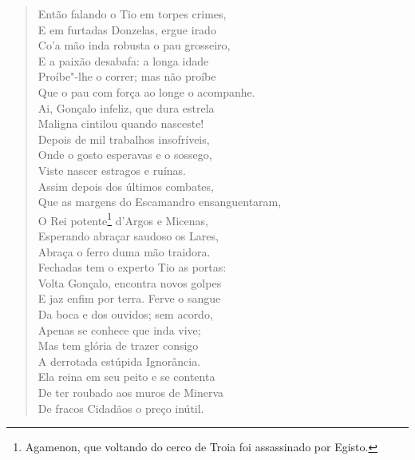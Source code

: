 \begin{verse}
Então falando o Tio em torpes crimes,\\
E em furtadas Donzelas, ergue irado\\
Co'a mão inda robusta o pau grosseiro,\\
E a paixão desabafa: a longa idade\\
Proíbe"-lhe o correr; mas não proíbe\\
Que o pau com força ao longe o acompanhe.\\
Ai, Gonçalo infeliz, que dura estrela\\
Maligna cintilou quando nasceste!\\
Depois de mil trabalhos insofríveis,\\
Onde o gosto esperavas e o sossego,\\
Viste nascer estragos e ruínas.\\
Assim depois dos últimos combates,\\
Que as margens do Escamandro \qb{}ensanguentaram,\\
O Rei potente\footnote{ Agamenon, que voltando do cerco de Troia foi
assassinado por Egisto.} d'Argos e Micenas,\\
Esperando abraçar saudoso os Lares,\\
Abraça o ferro duma mão traidora.\\
Fechadas tem o experto Tio as portas:\\
Volta Gonçalo, encontra novos golpes\\
E jaz enfim  por terra. Ferve o sangue\\
Da boca e dos ouvidos; sem acordo,\\
Apenas se conhece que inda vive;\\
Mas tem glória de trazer consigo\\
A derrotada estúpida Ignorância.\\			\index{\Ignor}
Ela reina em seu peito e se contenta\\
De ter roubado aos muros de Minerva\\		\index{\Miner}
De fracos Cidadãos o preço inútil. \\[10pt]



\end{verse}
